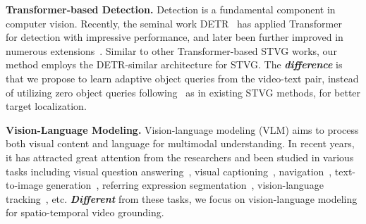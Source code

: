 \textbf{Transformer-based Detection.} Detection is a fundamental component in computer vision. Recently, the seminal work DETR~\citep{dert} has applied Transformer~\citep{vaswani2017attention} for detection with impressive performance, and later been further improved in numerous extensions~\citep{sun2021rethinking,zhu2020deformable,zheng2023less,ye2023cascade}. Similar to other Transformer-based STVG works, our method employs the DETR-similar architecture for STVG. The \emph{\textbf{difference}} is that we propose to learn adaptive object queries from the video-text pair, instead of utilizing zero object queries following~\citep{dert}  as in existing STVG methods, for better target localization. 

\textbf{Vision-Language Modeling.} Vision-language modeling (VLM) aims to process both visual content and language for multimodal understanding. In recent years, it has attracted great attention from the researchers and been studied in various tasks including visual question answering~\citep{antol2015vqa,jiang2020defense,han2023shot2story20k,shao2023prompting, wang2024reconstructive,weng2024longvlm}, visual captioning~\citep{you2016image,gu2023text,gu2022dual,wang2024droppos,shen2023accurate, ren2024pixellm, wang2023hard}, navigation~\citep{zhu2020vision,li2023improving}, text-to-image generation~\citep{MReward,ramesh2021zero}, referring expression segmentation~\citep{yang2022lavt,liu2023gres}, vision-language tracking~\citep{guo2022divert,zhou2023joint}, etc. \emph{\textbf{Different}} from these tasks, we focus on vision-language modeling for spatio-temporal video grounding.